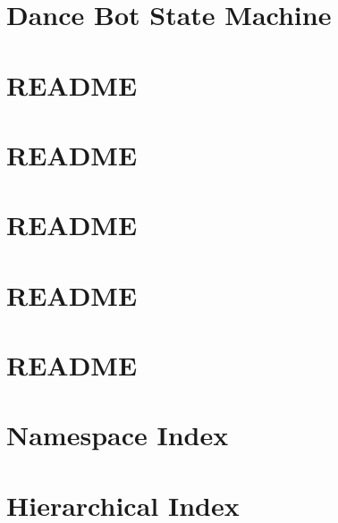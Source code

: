 \documentclass[twoside]{book}
\newcommand{\+}{\discretionary{\mbox{\scriptsize$\hookleftarrow$}}{}{}}
\begin{document}
\chapter{Dance Bot State Machine}
\label{md_smacc_sm_reference_library_sm_ridgeback_floor_coverage_static_1_launch_readme}

\chapter{R\+E\+A\+D\+ME}
\label{md_smacc_sm_reference_library_sm_ridgeback_floor_coverage_static_1_README}

\chapter{R\+E\+A\+D\+ME}
\label{md_smacc_sm_reference_library_sm_starcraft_ai_README}

\chapter{R\+E\+A\+D\+ME}
\label{md_smacc_sm_reference_library_sm_three_some_README}

\chapter{R\+E\+A\+D\+ME}
\label{md_smacc_sm_reference_library_sm_update_loop_README}

\chapter{R\+E\+A\+D\+ME}
\label{md_smacc_sm_reference_library_sm_viewer_sim_README}

\chapter{Namespace Index}

\chapter{Hierarchical Index}

\end{document}
